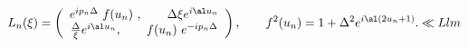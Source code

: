 \begin{equation}
  L_{n}(\xi)  = \left( \begin{array}{c}   e^{ip_n \Delta }~f(u_n)~,
 \qquad  {\Delta}{\xi}e^{i\al u_n} \\
 \frac{\Delta}{\xi}e^{i\al u_n}   ,\qquad f(u_n)~  e^{-ip_n \Delta }
    \end{array} \right), \qquad f^2(u_n)=
     1 + {\Delta^2} e^{i\al(2u_n+1)}.
\ll{Llm}\end{equation}

